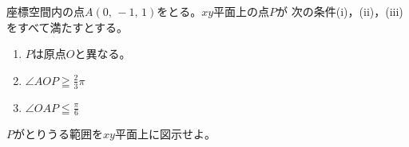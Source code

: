 \documentclass[../../main.tex]{subfiles}
\begin{document}
座標空間内の点$A(0, \, -1, \, 1)$をとる。$xy$平面上の点$P$が
次の条件(i)，(ii)，(iii)をすべて満たすとする。
\begin{enumerate}
  \item$P$は原点$O$と異なる。
  \item$\angle AOP \geqq \displaystyle\frac{2}{3}\pi$
  \item$\angle OAP \leqq \displaystyle\frac{\pi}{6}$
\end{enumerate}
$P$がとりうる範囲を$xy$平面上に図示せよ。
\end{document}
